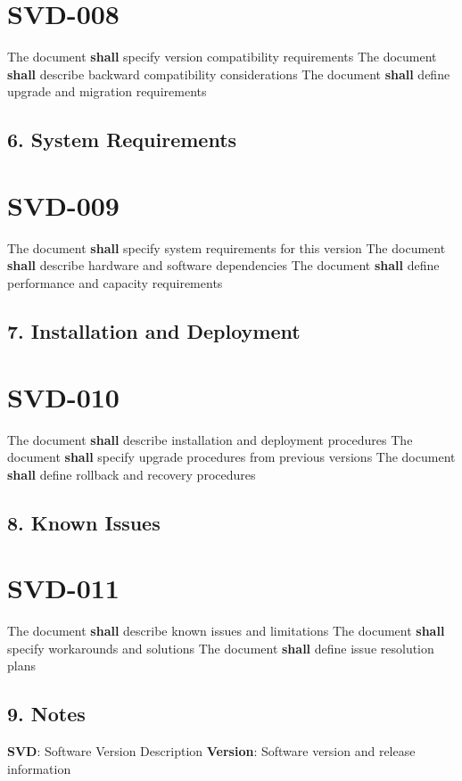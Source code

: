 \section{SVD-008}\label{SVD-008}

The document \textbf{shall} specify version compatibility requirements
The document \textbf{shall} describe backward compatibility considerations
The document \textbf{shall} define upgrade and migration requirements

\subsection{6. System Requirements}

\section{SVD-009}\label{SVD-009}

The document \textbf{shall} specify system requirements for this version
The document \textbf{shall} describe hardware and software dependencies
The document \textbf{shall} define performance and capacity requirements

\subsection{7. Installation and Deployment}

\section{SVD-010}\label{SVD-010}

The document \textbf{shall} describe installation and deployment procedures
The document \textbf{shall} specify upgrade procedures from previous versions
The document \textbf{shall} define rollback and recovery procedures

\subsection{8. Known Issues}

\section{SVD-011}\label{SVD-011}

The document \textbf{shall} describe known issues and limitations
The document \textbf{shall} specify workarounds and solutions
The document \textbf{shall} define issue resolution plans

\subsection{9. Notes}
\textbf{SVD}: Software Version Description
\textbf{Version}: Software version and release information

